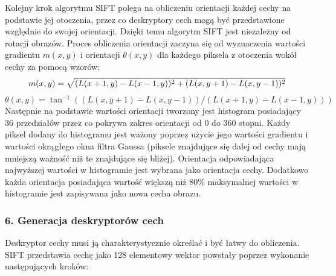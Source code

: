 Kolejny krok algorytmu SIFT polega na obliczeniu orientacji każdej cechy na podstawie jej otoczenia, przez co deskryptory cech mogą być przedstawione względnie do swojej orientacji. Dzięki temu algorytm SIFT jest niezależny od rotacji obrazów. Proces obliczenia orientacji zaczyna się od wyznaczenia wartości gradientu $m(x, y)$ i orientacji $\theta(x, y)$ dla każdego piksela z otoczenia wokół cechy za pomocą wzorów:
\begin{equation}
m(x, y) = \sqrt{(L(x + 1, y) - L(x - 1, y))^2 + (L(x, y + 1) - L(x, y - 1))^2} \\
\label{eq:magnitude}
\end{equation}
\begin{equation}
\theta(x, y) = \tan^{-1}((L(x, y + 1) - L(x, y - 1))/(L(x + 1, y) - L(x - 1, y)))
\label{eq:orientation}
\end{equation}
Następnie na podstawie wartości orientacji tworzony jest histogram posiadający 36 przedziałów przez co pokrywa zakres orientacji od 0 do 360 stopni. Każdy piksel dodany do histogramu jest ważony poprzez użycie jego wartości gradientu i wartości okrągłego okna filtra Gaussa (piksele znajdujące się dalej od cechy mają mniejszą ważność niż te znajdujące się bliżej). Orientacja odpowiadająca najwyższej wartości w histogramie jest wybrana jako orientacja cechy. Dodatkowo każda orientacja posiadająca wartość większą niż 80\% maksymalnej wartości w histogramie jest zapisywana jako nowa cecha obrazu.

\subsubsection{6. Generacja deskryptorów cech}
\label{sec:proponowane_algorytmy:deskryptor}

Deskryptor cechy musi ją charakterystycznie określać i być łatwy do obliczenia. SIFT przedstawia cechę jako 128 elementowy wektor powstały poprzez wykonanie następujących kroków:

